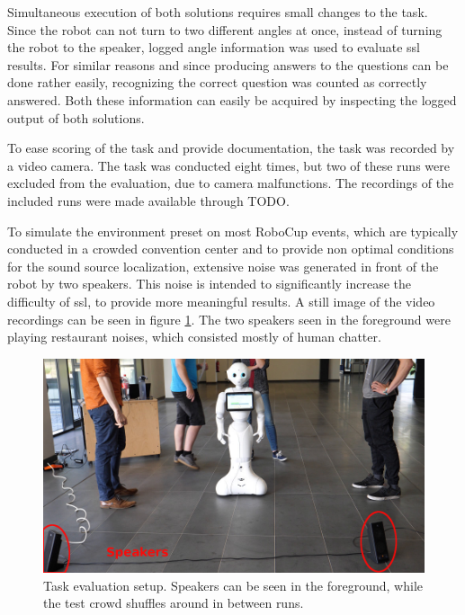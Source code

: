 Simultaneous execution of both solutions requires small changes to the task.
Since the robot can not turn to two different angles at once, instead of turning the robot to the speaker, logged angle information was used to evaluate \gls{ssl} results.
For similar reasons and since producing answers to the questions can be done rather easily, recognizing the correct question was counted as correctly answered.
Both these information can easily be acquired by inspecting the logged output of both solutions.

To ease scoring of the task and provide documentation, the task was recorded by a video camera.
The task was conducted eight times, but two of these runs were excluded from the evaluation, due to camera malfunctions.
The recordings of the included runs were made available through TODO.

To simulate the environment preset on most RoboCup events, which are typically conducted in a crowded convention center and to provide non optimal conditions for the sound source localization, extensive noise was generated in front of the robot by two speakers.
This noise is intended to significantly increase the difficulty of \gls{ssl}, to provide more meaningful results.
A still image of the video recordings can be seen in figure \ref{pic:eval_task_setup_pepper}.
The two speakers seen in the foreground were playing restaurant noises, which consisted mostly of human chatter.

\begin{figure}[]
	\centering
	\includegraphics[width=\textwidth]{bilder/eval/pepper_task_setup_small.jpg}
	\caption{Task evaluation setup. 
		Speakers can be seen in the foreground, while the test crowd shuffles around in between runs.}
	\label{pic:eval_task_setup_pepper}
\end{figure}

